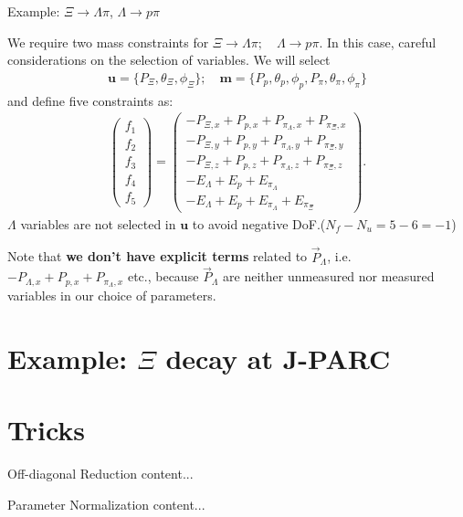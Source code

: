\documentclass[
	xcolor=dvipsnames,
	aspectratio=169,	
	10pt, 
	]{beamer}
\begin{document}
\begin{frame}{Example: $\Xi\to \Lambda\pi$, $\Lambda\to p\pi$}
	\begin{block}{}
		We require two mass constraints for $\Xi\to \Lambda\pi;\quad \Lambda\to p\pi$. In this case, careful considerations on the selection of variables. We will select
		\begin{align}
			\mathbf{u} = \{P_\Xi,\theta_\Xi,\phi_\Xi\};\quad \mathbf{m}=\{P_p,\theta_p,\phi_p,P_\pi,\theta_\pi,\phi_\pi\}
		\end{align}
		and define five constraints as:
		\begin{align}
			\begin{pmatrix}
				f_1\\f_2\\f_3\\f_4\\f_5
			\end{pmatrix}=
			\begin{pmatrix}
				-P_{\Xi,x}+P_{p,x}+P_{{\pi_\Lambda},x}+P_{{\pi_\Xi},x}\\
				-P_{\Xi,y}+P_{p,y}+P_{{\pi_\Lambda},y}+P_{{\pi_\Xi},y}\\
				-P_{\Xi,z}+P_{p,z}+P_{{\pi_\Lambda},z}+P_{{\pi_\Xi},z}\\
				-E_\Lambda +E_p+E_{\pi_\Lambda}\\
				-E_\Lambda +E_p+E_{\pi_\Lambda}+E_{\pi_\Xi}
			\end{pmatrix}.
		\end{align}
		$\Lambda$ variables are not selected in $\mathbf u$ to avoid negative DoF.($N_{f} - N_{u} = 5 - 6 = -1$)
			
		Note that \textbf{we don't have explicit terms} related to $\vec P_\Lambda$, i.e.  $-P_{\Lambda,x}+P_{p,x}+P_{{\pi_\Lambda},x}$ etc., because $\vec P_\Lambda$ are neither unmeasured nor measured variables in our choice of parameters.  
	\end{block}
\end{frame}
\section{Example: $\Xi $ decay at J-PARC}
\section{Tricks}
\begin{frame}{Off-diagonal Reduction}
	content...
\end{frame}
\begin{frame}{Parameter Normalization}
	content...
\end{frame}
\end{document}
